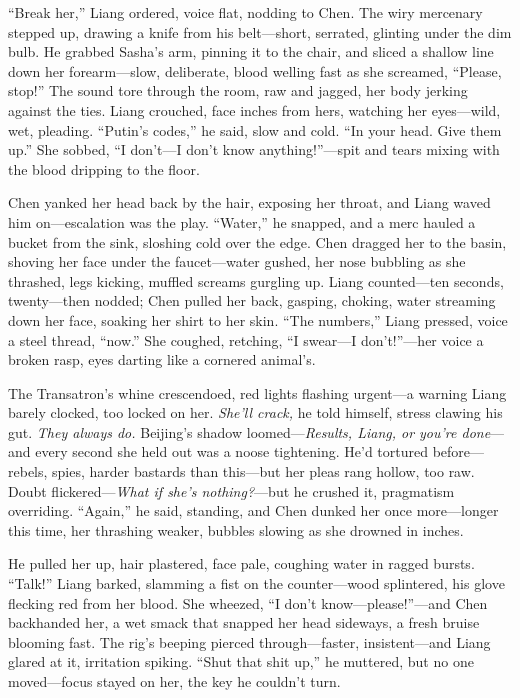 \documentclass[12pt]{book}
\begin{document}
“Break her,” Liang ordered, voice flat, nodding to Chen. The wiry mercenary stepped up, drawing a knife from his belt—short, serrated, glinting under the dim bulb. He grabbed Sasha’s arm, pinning it to the chair, and sliced a shallow line down her forearm—slow, deliberate, blood welling fast as she screamed, “Please, stop!” The sound tore through the room, raw and jagged, her body jerking against the ties. Liang crouched, face inches from hers, watching her eyes—wild, wet, pleading. “Putin’s codes,” he said, slow and cold. “In your head. Give them up.” She sobbed, “I don’t—I don’t know anything!”—spit and tears mixing with the blood dripping to the floor.

Chen yanked her head back by the hair, exposing her throat, and Liang waved him on—escalation was the play. “Water,” he snapped, and a merc hauled a bucket from the sink, sloshing cold over the edge. Chen dragged her to the basin, shoving her face under the faucet—water gushed, her nose bubbling as she thrashed, legs kicking, muffled screams gurgling up. Liang counted—ten seconds, twenty—then nodded; Chen pulled her back, gasping, choking, water streaming down her face, soaking her shirt to her skin. “The numbers,” Liang pressed, voice a steel thread, “now.” She coughed, retching, “I swear—I don’t!”—her voice a broken rasp, eyes darting like a cornered animal’s.

The Transatron’s whine crescendoed, red lights flashing urgent—a warning Liang barely clocked, too locked on her. \textit{She’ll crack,} he told himself, stress clawing his gut. \textit{They always do.} Beijing’s shadow loomed—\textit{Results, Liang, or you’re done}—and every second she held out was a noose tightening. He’d tortured before—rebels, spies, harder bastards than this—but her pleas rang hollow, too raw. Doubt flickered—\textit{What if she’s nothing?}—but he crushed it, pragmatism overriding. “Again,” he said, standing, and Chen dunked her once more—longer this time, her thrashing weaker, bubbles slowing as she drowned in inches.

He pulled her up, hair plastered, face pale, coughing water in ragged bursts. “Talk!” Liang barked, slamming a fist on the counter—wood splintered, his glove flecking red from her blood. She wheezed, “I don’t know—please!”—and Chen backhanded her, a wet smack that snapped her head sideways, a fresh bruise blooming fast. The rig’s beeping pierced through—faster, insistent—and Liang glared at it, irritation spiking. “Shut that shit up,” he muttered, but no one moved—focus stayed on her, the key he couldn’t turn.
\end{document}
